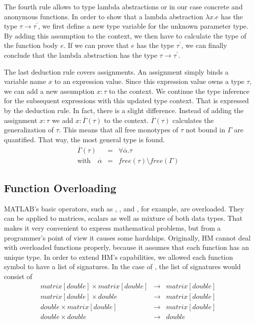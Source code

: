 The fourth rule allows to type lambda abstractions or in our case concrete and anonymous functions.
In order to show that a lambda abstraction $\lambda x.e$ has the type $\tau\rightarrow \tau^\prime$, we first define a new type variable for the unknown parameter type.
By adding this assumption to the context, we then have to calculate the type of the function body $e$.
If we can prove that $e$ has the type $\tau^\prime$, we can finally conclude that the lambda abstraction has the type $\tau \rightarrow \tau^\prime$.

The last deduction rule covers assignments.
An assignment simply binds a variable name $x$ to an expression value.
Since this expression value owns a type $\tau$, we can add a new assumption $x:\tau$ to the context.
We continue the type inference for the subsequent expressions with this updated type context.
That is expressed by the deduction rule.
In fact, there is a slight difference.
Instead of adding the assignment $x:\tau$ we add $x:\overline{\Gamma}(\tau)$ to the context.
$\overline{\Gamma}(\tau)$ calculates the generalization of $\tau$.
This means that all free monotypes of $\tau$ not bound in $\Gamma$ are quantified.
That way, the most general type is found.
\begin{eqnarray*}
	\overline{\Gamma}(\tau) &=& \forall \overline{\alpha}. \tau\\
	\text{with}\quad\overline{\alpha} &=& free(\tau) \setminus free(\Gamma)
\end{eqnarray*}

\subsection{Function Overloading}

MATLAB's basic operators, such as \code{+}, \code{-}, \code{/} and \code{*}, for example, are overloaded.
They can be applied to matrices, scalars as well as mixture of both data types.
That makes it very convenient to express mathematical problems, but from a programmer's point of view it causes some hardships.
Originally, HM cannot deal with overloaded functions properly, because it assumes that each function has an unique type.
In order to extend HM's capabilities, we allowed each function symbol to have a list of signatures.
In the case of \code{+}, the list of signatures would consist of 
\begin{eqnarray*}
matrix[double] \times matrix[double] &\rightarrow& matrix[double]\\
matrix[double] \times double &\rightarrow& matrix[double]\\
double \times matrix[double] &\rightarrow& matrix[double]\\
double \times double &\rightarrow& double
\end{eqnarray*}


